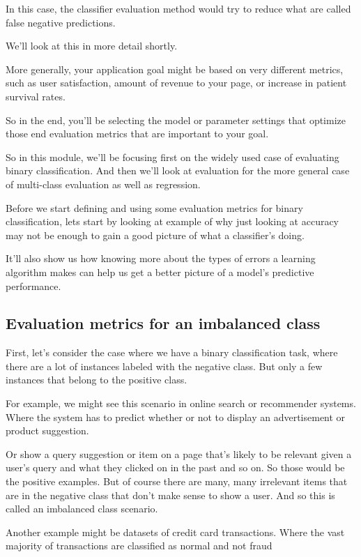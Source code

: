 \begin{multicols}{2}
In this case, the classifier evaluation method would try to reduce what are called false negative predictions. 

We'll look at this in more detail shortly. 

More generally, your application goal might be based on very different metrics, such as user satisfaction, amount of revenue to your page, or increase in patient survival rates. 

So in the end, you'll be selecting the model or parameter settings that optimize those end evaluation metrics that are important to your goal. 

So in this module, we'll be focusing first on the widely used case of evaluating binary classification. And then we'll look at evaluation for the more general case of multi-class evaluation as well as regression. 

Before we start defining and using some evaluation metrics for binary classification, lets start by looking at example of why just looking at accuracy may not be enough to gain a good picture of what a classifier's doing. 

It'll also show us how knowing more about the types of errors a learning algorithm makes can help us get a better picture of a model's predictive performance. 

\subsection{Evaluation metrics for an imbalanced class}

First, let's consider the case where we have a binary classification task, where there are a lot of instances labeled with the negative class. But only a few instances that belong to the positive class. 

For example, we might see this scenario in online search or recommender systems. Where the system has to predict whether or not to display an advertisement or product suggestion. 

Or show a query suggestion or item on a page that's likely to be relevant given a user's query and what they clicked on in the past and so on. So those would be the positive examples. But of course there are many, many irrelevant items that are in the negative class that don't make sense to show a user. And so this is called an imbalanced class scenario. 

Another example might be datasets of credit card transactions. Where the vast majority of transactions are classified as normal and not fraud 


\end{multicols}
